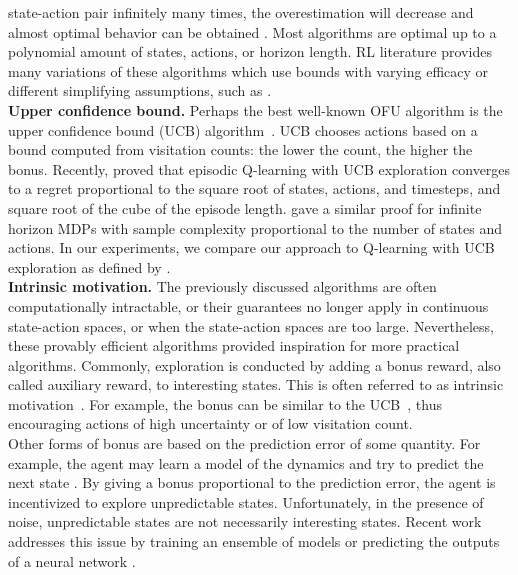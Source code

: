 \documentclass{article}
\begin{document}
state-action pair infinitely many times, the overestimation will
decrease and almost optimal behavior can be obtained
\citep{kakade2003sample}. Most algorithms are optimal up to a
polynomial amount of states, actions, or horizon length. RL literature provides many variations of these algorithms which use
bounds with varying efficacy or different simplifying assumptions, such as \citep{kearns2002near,brafman2002r,kakade2003sample,auer2007logarithmic,jaksch2010near,dann2015sample}.
\\[5pt]
\textbf{Upper confidence bound.}
Perhaps the best well-known OFU algorithm is the upper confidence
bound (UCB) algorithm~\citep{auer2002finite}. UCB chooses actions based on a
bound computed from visitation counts: the lower the count, the higher the bonus. Recently, \citet{jin2018iq}
proved that episodic Q-learning with UCB exploration converges to a
regret proportional to the square root of states, actions, and timesteps, and square root of the cube of the episode
length. \citet{dong2019q} gave a similar proof for infinite horizon
MDPs with sample complexity proportional to the number of states and
actions. In our experiments, we compare our approach to Q-learning
with UCB exploration as defined by \citet{auer2002finite}.
\\[5pt]
\textbf{Intrinsic motivation.}
The previously discussed algorithms are often computationally intractable,
or their guarantees no longer apply in continuous state-action
spaces, or when the state-action spaces are too
large. Nevertheless, these provably efficient algorithms provided
inspiration for more practical algorithms. Commonly, exploration is conducted by adding a bonus reward,
also called auxiliary reward, to interesting states. This is often
referred to as intrinsic motivation~\citep{ryan2000intrinsic}. For
example, the bonus can be similar to the
UCB~\citep{strehl2008analysis,bellemare2016unifying}, thus encouraging actions of high uncertainty or of low visitation count.
\\
Other forms of bonus are based on the prediction error of some
quantity. For example, the agent may learn a model of the dynamics and
try to predict the next state \citep{stadie2015incentivizing,houthooft2016vime,pathak2017curiosity,schmidhuber1991possibility,schmidhuber2006developmental}. By
giving a bonus proportional to the prediction error, the agent is incentivized to explore unpredictable states. Unfortunately, in the presence of noise, unpredictable states are not necessarily interesting states.
Recent work addresses this issue
by training an ensemble of models \citep{pathak2019self} or predicting
the outputs of a neural network \citep{burda2018exploration}.
\end{document}
